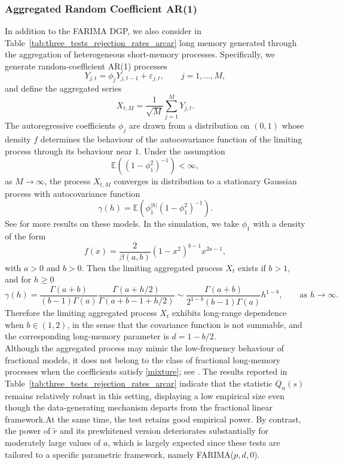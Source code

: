 \documentclass[10pt,a4paper]{amsart}
\numberwithin{equation}{section}
\begin{document}
\subsubsection{Aggregated Random Coefficient AR(1)}
In addition to the  FARIMA DGP, we also consider in Table~\ref{tab:three_tests_rejection_rates_arcar} long memory generated through the aggregation of heterogeneous short-memory processes. Specifically, we generate random-coefficient AR(1) processes
\[
Y_{j,t}=\phi_j Y_{j,t-1}+\varepsilon_{j,t}, \qquad j=1,\ldots,M,
\]
and define the aggregated series
\[
X_{t,M}=\frac{1}{\sqrt{M}}\sum_{j=1}^M Y_{j,t}.
\]
The autoregressive coefficients $\phi_j$ are drawn from a distribution on $(0,1)$ whose density $f$ determines the behaviour of the autocovariance function of the limiting process through its behaviour near $1$. Under the assumption
\[
\mathbb{E}\!\left((1-\phi_1^2)^{-1}\right) < \infty,
\]
as $M\to\infty$, the process $X_{t,M}$ converges in distribution to a stationary Gaussian process with autocovariance function
\[
\gamma(h)=\mathbb{E}\!\left(\phi_1^{|h|}(1-\phi_1^2)^{-1}\right).
\]
See \cite{Leipus2014Aggregation,MR3075595,MR2977317} for more results on these models. 
In the simulation, we take $\phi_1$ with a density of the form
\begin{equation} \label{mixture}
     f(x) = \dfrac{2}{\beta (a,b)} (1-x^2)^{b-1 } x^{2a -1},
\end{equation}
with $a>0$ and $b>0$. Then the limiting aggregated process $X_t$ exists if $b>1$, and for $h\geq 0$
\[
\gamma(h) =
\frac{\Gamma (a+b)}{(b-1) \Gamma(a)}
\frac{\Gamma (a+h/2)}{ \Gamma(a+b-1 +h/2)}
\sim
\frac{\Gamma (a+b)}{ 2^{1-b}(b-1) \Gamma(a)} h^{1-b},\qquad\textrm{as }h\to\infty.
\]
Therefore the limiting aggregated process $X_t$ exhibits long-range dependence when $b\in(1,2)$, in the sense that the covariance function is not summable, and the corresponding long-memory parameter is $d = 1-b/2$.\\
Although the aggregated process may mimic the low-frequency behaviour of fractional models, it does not belong to the class of fractional long-memory processes when the coefficients satisfy \eqref{mixture}; see \cite{Celov01052010}. The results reported in Table~\ref{tab:three_tests_rejection_rates_arcar} indicate that the statistic $Q_n(s)$ remains relatively robust in this setting, displaying a low empirical size even though the data-generating mechanism departs from the fractional linear framework.At the same time, the test retains good empirical power. By contrast, the power of $\tilde r$ and its prewhitened version deteriorates substantially for moderately large values of $a$, which is largely expected since these tests are tailored to a specific parametric framework, namely FARIMA($p,d,0$).
\end{document}
